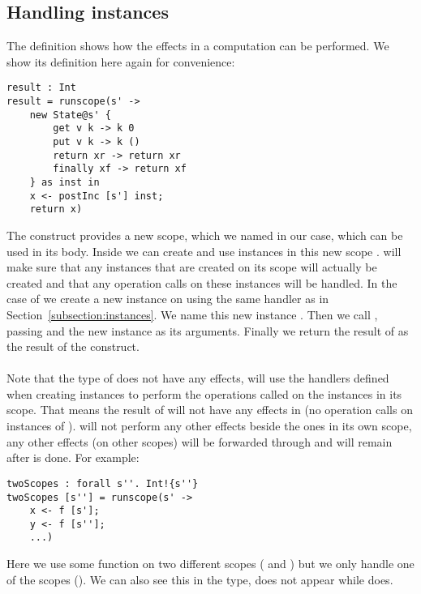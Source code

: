 \subsection{Handling instances}
The definition  shows how the effects in a computation can be performed.
We show its definition here again for convenience:

\begin{verbatim}
result : Int
result = runscope(s' ->
	new State@s' {
		get v k -> k 0
		put v k -> k ()
		return xr -> return xr
		finally xf -> return xf
	} as inst in
	x <- postInc [s'] inst;
	return x)
\end{verbatim}

The  construct provides a new scope, which we named  in our case, which can be used in its body.
Inside  we can create and use instances in this new scope .
 will make sure that any instances that are created on its scope will actually be created and that any operation calls on these instances will be handled.
In the case of  we create a new  instance on  using the same handler as in Section~\ref{subsection:instances}.
We name this new instance .
Then we call , passing  and the new instance as its arguments.
Finally we return the result of  as the result of the  construct.
\\\\
Note that the type of  does not have any effects,  will use the handlers defined when creating instances to perform the operations called on the instances in its scope.
That means the result of  will not have any effects in  (no operation calls on instances of ).
 will not perform any other effects beside the ones in its own scope, any other effects (on other scopes) will be forwarded through and will remain after  is done.
For example:

\begin{verbatim}
twoScopes : forall s''. Int!{s''}
twoScopes [s''] = runscope(s' ->
	x <- f [s'];
	y <- f [s''];
	...)
\end{verbatim}

Here we use some function  on two different scopes ( and ) but we only handle one of the scopes ().
We can also see this in the type,  does not appear while  does. 

